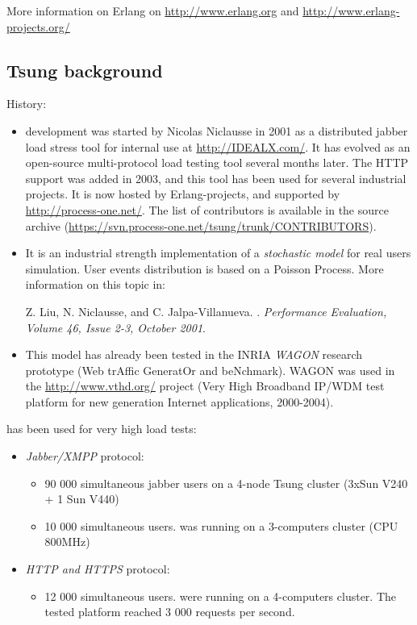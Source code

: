 \documentclass{TSUNG-en}
\begin{document}
More information on Erlang on \url{http://www.erlang.org} and
\url{http://www.erlang-projects.org/}


\subsection{Tsung background}

History:
\begin{itemize}
\item {} development was started by Nicolas Niclausse in
  2001 as a distributed jabber load stress tool for internal use at
  \url{http://IDEALX.com/}.  It has evolved as an open-source
  multi-protocol load testing tool several months later. The HTTP
  support was added in 2003, and this tool has been used for several
  industrial projects.  It is now hosted by Erlang-projects, and
  supported by \url{http://process-one.net/}. The list of contributors
  is available in the source archive
  (\url{https://svn.process-one.net/tsung/trunk/CONTRIBUTORS}).

\item It is an industrial strength implementation of a \emph{stochastic model}
for real users simulation. User events distribution is based on a
Poisson Process. More information on this topic in:

Z. Liu, N. Niclausse, and C. Jalpa-Villanueva.  . \emph{Performance Evaluation,
Volume 46, Issue 2-3, October 2001}.

\item This model has already been tested in the INRIA \emph{WAGON}
  research prototype (Web trAffic GeneratOr and beNchmark). WAGON was
  used in the \url{http://www.vthd.org/} project (Very High Broadband
  IP/WDM test platform for new generation Internet applications, 2000-2004).

\end{itemize}

 has been used for very high load tests:

\begin{itemize}
\item \emph{Jabber/XMPP} protocol:
  \begin{itemize}
  \item 90 000 simultaneous jabber users on a
  4-node Tsung cluster (3xSun V240 + 1 Sun V440)
\item 10 000 simultaneous users.
   was running on a 3-computers cluster (CPU
  800MHz)
  \end{itemize}
\item \emph{HTTP and HTTPS} protocol:
  \begin{itemize}
  \item 12 000 simultaneous users.
   were running on a 4-computers cluster. The
  tested platform reached 3 000 requests per second.
  \end{itemize}
\end{itemize}
\end{document}
